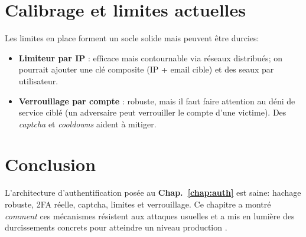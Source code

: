 \section{Calibrage et limites actuelles}
\noindent Les limites en place forment un socle solide mais peuvent être durcies:
\begin{itemize}
  \item \textbf{Limiteur par IP} : efficace mais contournable via réseaux distribués; on pourrait ajouter une clé composite (IP + email cible) et des \og seaux \fg{} par utilisateur.
  \item \textbf{Verrouillage par compte} : robuste, mais il faut faire attention au déni de service ciblé (un adversaire peut \og verrouiller \fg{} le compte d'une victime). Des \emph{captcha} et \emph{cooldowns} aident à mitiger.
\end{itemize}


\section{Conclusion}
\noindent L'architecture d'authentification posée au \textbf{Chap.~\ref{chap:auth}} est saine: hachage robuste, 2FA réelle, captcha, limites et verrouillage. Ce chapitre a montré \emph{comment} ces mécanismes résistent aux attaques usuelles et a mis en lumière des durcissements concrets pour atteindre un niveau \og production \fg{}.


